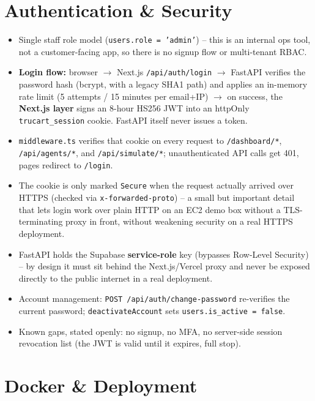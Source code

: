 \documentclass[11pt,a4paper]{article}
\begin{document}
\section{Authentication \& Security}

\begin{itemize}[itemsep=2pt]
\item Single staff role model (\texttt{users.role = 'admin'}) -- this is an internal ops tool,
not a customer-facing app, so there is no signup flow or multi-tenant RBAC.
\item \textbf{Login flow:} browser $\to$ Next.js \texttt{/api/auth/login} $\to$ FastAPI
verifies the password hash (bcrypt, with a legacy SHA1 path) and applies an in-memory rate
limit (5 attempts / 15 minutes per email+IP) $\to$ on success, the \textbf{Next.js layer}
signs an 8-hour HS256 JWT into an httpOnly \texttt{trucart\_session} cookie. FastAPI itself
never issues a token.
\item \texttt{middleware.ts} verifies that cookie on every request to \texttt{/dashboard/*},
\texttt{/api/agents/*}, and \texttt{/api/simulate/*}; unauthenticated API calls get 401, pages
redirect to \texttt{/login}.
\item The cookie is only marked \texttt{Secure} when the request actually arrived over HTTPS
(checked via \texttt{x-forwarded-proto}) -- a small but important detail that lets login work
over plain HTTP on an EC2 demo box without a TLS-terminating proxy in front, without weakening
security on a real HTTPS deployment.
\item FastAPI holds the Supabase \textbf{service-role} key (bypasses Row-Level Security) --
by design it must sit behind the Next.js/Vercel proxy and never be exposed directly to the
public internet in a real deployment.
\item Account management: \texttt{POST /api/auth/change-password} re-verifies the current
password; \texttt{deactivateAccount} sets \texttt{users.is\_active = false}.
\item Known gaps, stated openly: no signup, no MFA, no server-side session revocation list
(the JWT is valid until it expires, full stop).
\end{itemize}

\section{Docker \& Deployment}
\end{document}
